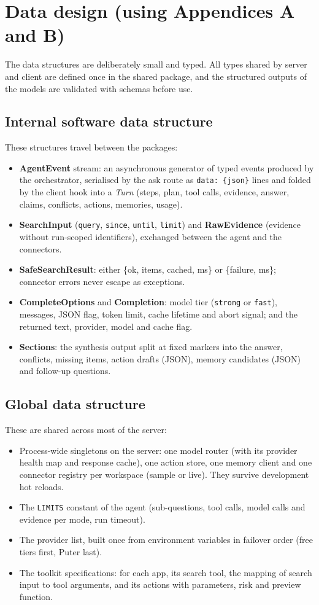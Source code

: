 \documentclass[oneside,a4paper,12pt]{report}
\begin{document}
\section{Data design (using Appendices A and B)}
The data structures are deliberately small and typed. All types shared by server and client are defined once in the shared package, and the structured outputs of the models are validated with schemas before use.
\subsection{Internal software data structure}
These structures travel between the packages:
\begin{itemize}
\item \textbf{AgentEvent} stream: an asynchronous generator of typed events produced by the orchestrator, serialised by the ask route as \texttt{data: \{json\}} lines and folded by the client hook into a \emph{Turn} (steps, plan, tool calls, evidence, answer, claims, conflicts, actions, memories, usage).
\item \textbf{SearchInput} (\texttt{query}, \texttt{since}, \texttt{until}, \texttt{limit}) and \textbf{RawEvidence} (evidence without run-scoped identifiers), exchanged between the agent and the connectors.
\item \textbf{SafeSearchResult}: either \{ok, items, cached, ms\} or \{failure, ms\}; connector errors never escape as exceptions.
\item \textbf{CompleteOptions} and \textbf{Completion}: model tier (\texttt{strong} or \texttt{fast}), messages, JSON flag, token limit, cache lifetime and abort signal; and the returned text, provider, model and cache flag.
\item \textbf{Sections}: the synthesis output split at fixed markers into the answer, conflicts, missing items, action drafts (JSON), memory candidates (JSON) and follow-up questions.
\end{itemize}
\subsection{Global data structure}
These are shared across most of the server:
\begin{itemize}
\item Process-wide singletons on the server: one model router (with its provider health map and response cache), one action store, one memory client and one connector registry per workspace (sample or live). They survive development hot reloads.
\item The \texttt{LIMITS} constant of the agent (sub-questions, tool calls, model calls and evidence per mode, run timeout).
\item The provider list, built once from environment variables in failover order (free tiers first, Puter last).
\item The toolkit specifications: for each app, its search tool, the mapping of search input to tool arguments, and its actions with parameters, risk and preview function.
\end{itemize}
\end{document}

